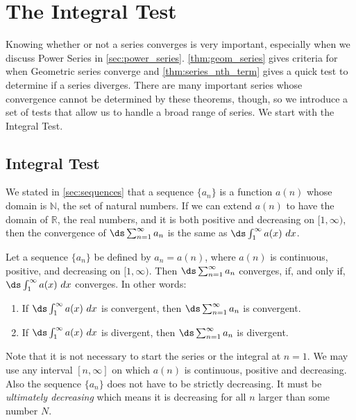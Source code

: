 \section{The Integral Test}\label{sec:int_tests}

Knowing whether or not a series converges is very important, especially when we discuss Power Series in \autoref{sec:power_series}. \autoref{thm:geom_series} gives criteria for when Geometric series converge and \autoref{thm:series_nth_term} gives a quick test to determine if a series diverges. There are many important series whose convergence cannot be determined by these theorems, though, so we introduce a set of tests that allow us to handle a broad range of series. We start with the Integral Test.


\subsection{Integral Test}

We stated in \autoref{sec:sequences} that a sequence $\{a_n\}$ is a function $a(n)$ whose domain is $\mathbb{N}$, the set of natural numbers. If we can extend $a(n)$ to have the domain of $\mathbb{R}$, the real numbers, and it is both positive and decreasing on $[1,\infty)$, then the convergence of $\ds \sum_{n=1}^\infty a_n$ is the same as $\ds\int_1^\infty a(x)\ dx$. 

{Let a sequence $\{a_n\}$ be defined by $a_n=a(n)$, where $a(n)$ is continuous, positive, and decreasing on $[1,\infty)$. Then $\ds \sum_{n=1}^\infty a_n$ converges, if, and only if, $\ds\int_1^\infty a(x)\ dx$ converges. In other words:
\begin{enumerate}
\item If $\ds \int_1^\infty a(x)\ dx$ is convergent, then $\ds \sum_{n=1}^\infty a_n$ is convergent.
\item If $\ds \int_1^\infty a(x)\ dx$ is divergent, then $\ds \sum_{n=1}^\infty a_n$ is divergent.
\end{enumerate}
}

Note that it is not necessary to start the series or the integral at $n=1$. We may use any interval $[n,\infty]$ on which $a(n)$ is continuous, positive and decreasing. Also the sequence $\{a_n\}$ does not have to be strictly decreasing. It must be \textit{ultimately decreasing} which means it is decreasing for all $n$ larger than some number $N$.\bigskip



